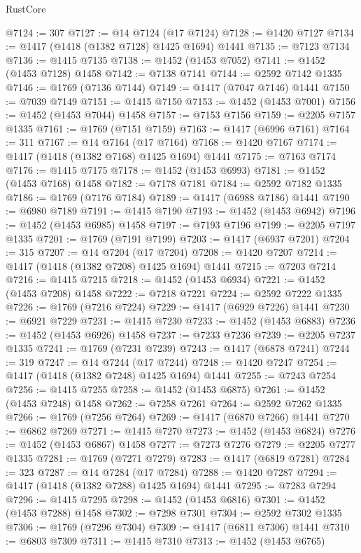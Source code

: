 \begin{lexlean}{RustCore}
\begin{coremodule}
@7124 := 307
@7127 := @14 @7124 (@17 @7124)
@7128 := @1420 @7127
@7134 := @1417 (@1418 (@1382 @7128) @1425 @1694) @1441
@7135 := @7123 @7134
@7136 := @1415 @7135
@7138 := @1452 (@1453 @7052)
@7141 := @1452 (@1453 @7128) @1458
@7142 := @7138 @7141
@7144 := @2592 @7142 @1335
@7146 := @1769 (@7136 @7144)
@7149 := @1417 (@7047 @7146) @1441
@7150 := @7039 @7149
@7151 := @1415 @7150
@7153 := @1452 (@1453 @7001)
@7156 := @1452 (@1453 @7044) @1458
@7157 := @7153 @7156
@7159 := @2205 @7157 @1335
@7161 := @1769 (@7151 @7159)
@7163 := @1417 (@6996 @7161)
@7164 := 311
@7167 := @14 @7164 (@17 @7164)
@7168 := @1420 @7167
@7174 := @1417 (@1418 (@1382 @7168) @1425 @1694) @1441
@7175 := @7163 @7174
@7176 := @1415 @7175
@7178 := @1452 (@1453 @6993)
@7181 := @1452 (@1453 @7168) @1458
@7182 := @7178 @7181
@7184 := @2592 @7182 @1335
@7186 := @1769 (@7176 @7184)
@7189 := @1417 (@6988 @7186) @1441
@7190 := @6980 @7189
@7191 := @1415 @7190
@7193 := @1452 (@1453 @6942)
@7196 := @1452 (@1453 @6985) @1458
@7197 := @7193 @7196
@7199 := @2205 @7197 @1335
@7201 := @1769 (@7191 @7199)
@7203 := @1417 (@6937 @7201)
@7204 := 315
@7207 := @14 @7204 (@17 @7204)
@7208 := @1420 @7207
@7214 := @1417 (@1418 (@1382 @7208) @1425 @1694) @1441
@7215 := @7203 @7214
@7216 := @1415 @7215
@7218 := @1452 (@1453 @6934)
@7221 := @1452 (@1453 @7208) @1458
@7222 := @7218 @7221
@7224 := @2592 @7222 @1335
@7226 := @1769 (@7216 @7224)
@7229 := @1417 (@6929 @7226) @1441
@7230 := @6921 @7229
@7231 := @1415 @7230
@7233 := @1452 (@1453 @6883)
@7236 := @1452 (@1453 @6926) @1458
@7237 := @7233 @7236
@7239 := @2205 @7237 @1335
@7241 := @1769 (@7231 @7239)
@7243 := @1417 (@6878 @7241)
@7244 := 319
@7247 := @14 @7244 (@17 @7244)
@7248 := @1420 @7247
@7254 := @1417 (@1418 (@1382 @7248) @1425 @1694) @1441
@7255 := @7243 @7254
@7256 := @1415 @7255
@7258 := @1452 (@1453 @6875)
@7261 := @1452 (@1453 @7248) @1458
@7262 := @7258 @7261
@7264 := @2592 @7262 @1335
@7266 := @1769 (@7256 @7264)
@7269 := @1417 (@6870 @7266) @1441
@7270 := @6862 @7269
@7271 := @1415 @7270
@7273 := @1452 (@1453 @6824)
@7276 := @1452 (@1453 @6867) @1458
@7277 := @7273 @7276
@7279 := @2205 @7277 @1335
@7281 := @1769 (@7271 @7279)
@7283 := @1417 (@6819 @7281)
@7284 := 323
@7287 := @14 @7284 (@17 @7284)
@7288 := @1420 @7287
@7294 := @1417 (@1418 (@1382 @7288) @1425 @1694) @1441
@7295 := @7283 @7294
@7296 := @1415 @7295
@7298 := @1452 (@1453 @6816)
@7301 := @1452 (@1453 @7288) @1458
@7302 := @7298 @7301
@7304 := @2592 @7302 @1335
@7306 := @1769 (@7296 @7304)
@7309 := @1417 (@6811 @7306) @1441
@7310 := @6803 @7309
@7311 := @1415 @7310
@7313 := @1452 (@1453 @6765)

\end{coremodule}
\end{lexlean}
